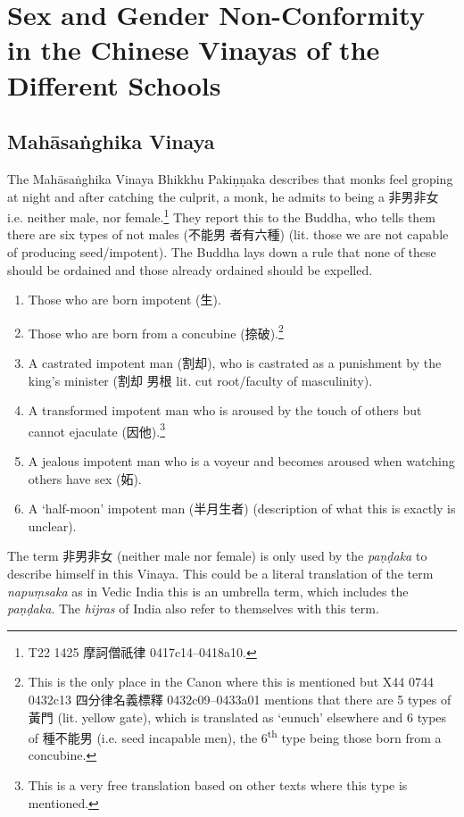 \section{Sex and Gender Non-Conformity in the Chinese Vinayas of the Different Schools}
\label{appendix1}

\subsection{Mahāsaṅghika Vinaya}
The Mahāsaṅghika Vinaya Bhikkhu Pakiṇṇaka describes that monks feel groping at night and after catching the culprit, a monk, he admits to being a 非男非女 i.e. neither male, nor female.\footnote{T22 1425 摩訶僧祇律 0417c14–0418a10.} They report this to the Buddha, who tells them there are six types of not males (不能男 者有六種) (lit. those we are not capable of producing seed/impotent). The Buddha lays down a rule that none of these should be ordained and those already ordained should be expelled.

\begin{enumerate}
\item Those who are born impotent (生). 
\item Those who are born from a concubine (捺破).\footnote{This is the only place in the Canon where this is mentioned but X44 0744 0432c13 四分律名義標釋 0432c09–0433a01 mentions that there are 5 types of 黃門 (lit. yellow gate), which is translated as `eunuch' elsewhere and 6 types of 種不能男 (i.e. seed incapable men), the 6\textsuperscript{th} type being those born from a concubine.}
\item A castrated impotent man (割却), who is castrated as a punishment by the king's minister (割却 男根 lit. cut root/faculty of masculinity).
\item A transformed impotent man who is aroused by the touch of others but cannot ejaculate (因他).\footnote{This is a very free translation based on other texts where this type is mentioned.}
\item A jealous impotent man who is a voyeur and becomes aroused when watching others have sex (妬).
\item A `half-moon' impotent man (半月生者) (description of what this is exactly is unclear).
\end{enumerate}

The term 非男非女 (neither male nor female) is only used by the {\em paṇḍaka} to describe himself in this Vinaya. This could be a literal translation of the term {\em napuṃsaka} as in Vedic India this is an umbrella term, which includes the {\em paṇḍaka}. The {\em hijras} of India also refer to themselves with this term.

